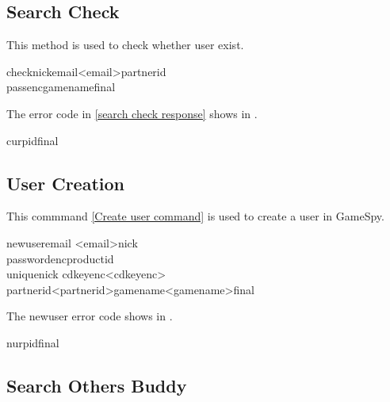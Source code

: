 \documentclass[oneside,titlepage,a4paper]{Definition/retrospy} %
\begin{document}
\subsection{Search Check}
This method is used to check whether user exist.
\ClientRequest

\begin{mybox}
	\tbs check\tbs\tbs nick\tbs <nick name>\tbs email\tbs<email>\tbs partnerid\tbs <partner id>\\\tbs passenc\tbs<encrypted password>\tbs gamename\tbs<game name>\tbs final\tbs
\end{mybox}

\ServerResponse
The error code in \ref{search check response} shows in .
\begin{mybox}[label = search check response]
	\tbs cur\tbs<check error code>\tbs pid\tbs <profile id>\tbs final\tbs
\end{mybox}

\subsection{User Creation}
This commmand \ref{Create user command} is used to create a user in GameSpy.
\ClientRequest

\begin{mybox}[label = Create user command]
\tbs newuser\tbs email \tbs <email>\tbs nick \\
\tbs passwordenc\tbs productid\\\tbs uniquenick
\tbs cdkeyenc\tbs <cdkeyenc>\\\tbs partnerid\tbs <partnerid>\tbs gamename\tbs <gamename>\tbs final\tbs
\end{mybox}

\ServerResponse
The newuser error code shows in .
\begin{mybox}
	\tbs nur\tbs<newuser error code>\tbs pid\tbs <profile id>\tbs final\tbs
\end{mybox}

\subsection{Search Others Buddy}
\ClientRequest
\end{document}
